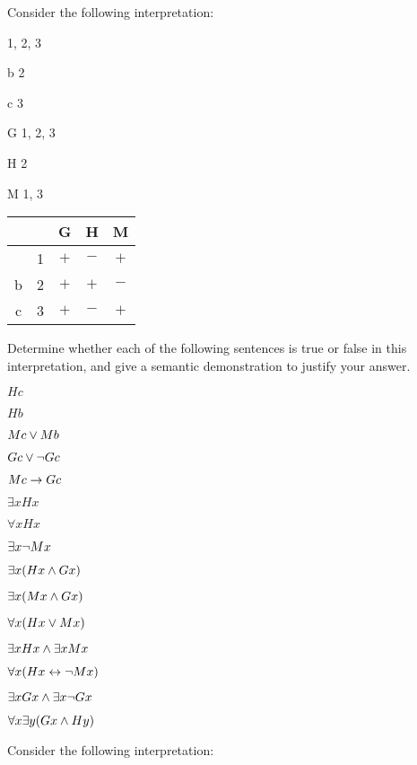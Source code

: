\problempart
Consider the following interpretation:


\begin{multicols}{2}
\begin{ekey}
		\item[\text{Domain}] 1, 2, 3
		\item[b] 2
		\item[c] 3
		\item[G] 1, 2, 3
		\item[H] 2
		\item[M] 1, 3
\end{ekey}
\columnbreak

\begin{tabular}{c|c|c|c|c|}
\hline
&    &   G  &   H  & M  \\ \hline
 & 1 &   $+$   &   $-$  & $+$  \\ \hline
b & 2   &   $+$   &   $+$ & $-$ \\ \hline
c  & 3   &   $+$   &   $-$ & $+$ \\ \hline
\end{tabular}
\end{multicols}



\noindent Determine whether each of the following sentences is true or false in this interpretation, and give a semantic demonstration to justify your answer.
\begin{earg}
\item $Hc$
\item $Hb$
\item $Mc \vee Mb$
\item $Gc \vee \neg Gc$
\item $Mc \rightarrow Gc$
\item $\exists x Hx$
\item $\forall x Hx$
\item $\exists x \neg Mx$
\item $\exists x(Hx \wedge Gx)$
\item $\exists x(Mx \wedge Gx)$
\item $\forall x(Hx \vee Mx)$
\item $\exists x Hx \wedge \exists x Mx$
\item $\forall x(Hx \leftrightarrow \neg Mx)$
\item $\exists x Gx \wedge \exists x \neg Gx$
\item $\forall x\exists y(Gx \wedge Hy)$
\end{earg}

\problempart
\label{pr.TorF3} Consider the following interpretation:



